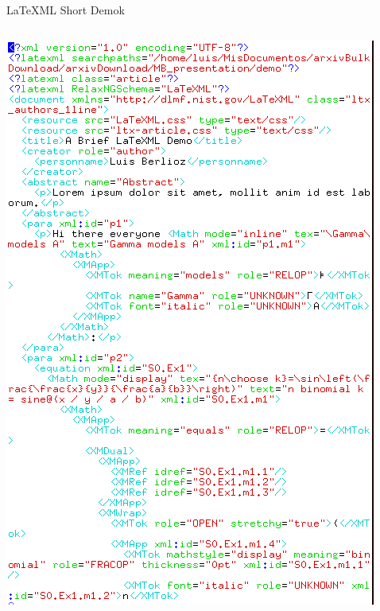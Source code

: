 \documentclass[9pt]{beamer}
\begin{document}
\begin{frame}{LaTeXML Short Demok}
\begin{columns}[T]
\begin{column}{0.5\textwidth}
    \includegraphics[width=\textwidth]{ltx_demo_output.png}
        \end{column}
    \end{columns}
\end{frame}
\end{document}
